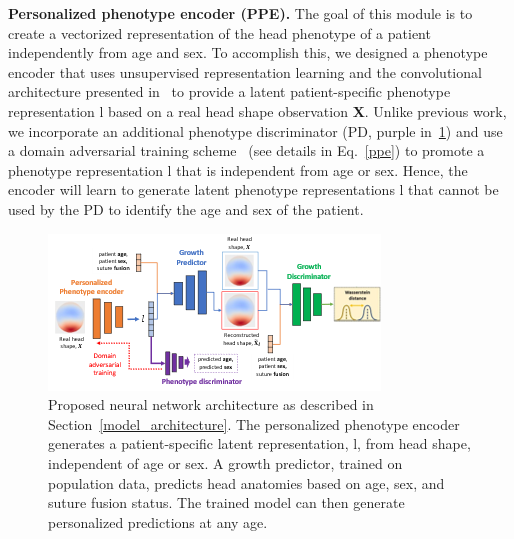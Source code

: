 \documentclass[conference]{IEEEtran}
\begin{document}
\textbf{Personalized phenotype encoder (PPE).} The goal of this module is to create a vectorized representation of the head phenotype of a patient independently from age and sex. To accomplish this, we designed a phenotype encoder that uses unsupervised representation learning and the convolutional architecture presented in~\cite{Radford2016Unsupervised} to provide a latent patient-specific phenotype representation l based on a real head shape observation \textbf{X}. Unlike previous work, we incorporate an additional phenotype discriminator (PD, purple in~\ref{fig:architecture}) and use a domain adversarial training scheme~\cite{Ganin2016Domain-Adversarial} (see details in Eq.~\ref{ppe})
to promote a phenotype representation l that is independent from age or sex. Hence, the encoder will learn to generate latent phenotype representations l that cannot be used by the PD to identify the age and sex of the patient.
\begin{figure}[!b]
\centering
\includegraphics[width=\columnwidth]{figures/NetworkArchitecture.png}
\caption{Proposed neural network architecture as described in Section~\ref{model_architecture}. The personalized phenotype encoder generates a patient-specific latent representation, l, from head shape, independent of age or sex. A growth predictor, trained on population data, predicts head anatomies based on age, sex, and suture fusion status. The trained model can then generate personalized predictions at any age.}
\label{fig:architecture}
\end{figure}
\end{document}

